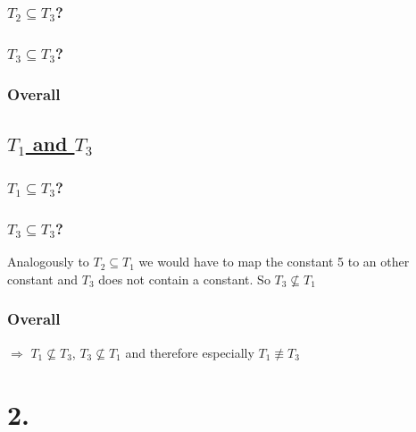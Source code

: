 \documentclass[12pt]{article}
\begin{document}
	\subsubsection*{$T_2 \subseteq T_3$?}
	\subsubsection*{$T_3 \subseteq T_3$?}
%	
	\subsubsection*{Overall}
	
	\subsection*{\underline{$T_1$ and $T_3$}}
	\subsubsection*{$T_1 \subseteq T_3$?}
	\subsubsection*{$T_3 \subseteq T_3$?}
	Analogously to $T_2 \subseteq T_1$ we would have to map the constant 5 to an other constant and $T_3$ does not contain a constant. So $T_3 \not \subseteq T_1$
	\subsubsection*{Overall}
	$\Rightarrow$ $T_1\not\subseteq T_3$, $T_3 \not\subseteq T_1$ and therefore especially $T_1 \not\equiv T_3$ 
	
	\section*{2.}
	
\end{document}
